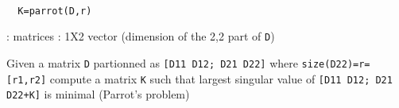 \begin{mandesc}
   \\ %
\end{mandesc}
\begin{calling_sequence}
\begin{verbatim}
  K=parrot(D,r)  
\end{verbatim}
\end{calling_sequence}
\begin{parameters}
  \begin{varlist}
    : matrices
    : 1X2 vector (dimension of the 2,2 part of \verb!D!)
  \end{varlist}
\end{parameters}
\begin{mandescription}
  Given a matrix \verb!D! partionned as \verb![D11 D12; D21 D22]!
  where \verb!size(D22)=r=[r1,r2]!
  compute a matrix \verb!K! such that
  largest singular value of \verb![D11 D12; D21 D22+K]!
  is minimal (Parrot's problem)
\end{mandescription}
\begin{manseealso}
\end{manseealso}
